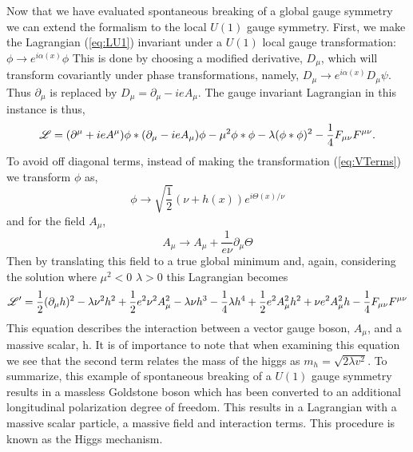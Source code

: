 Now that we have evaluated spontaneous breaking of 
a global gauge symmetry we can extend the formalism to the local $U(1)$ gauge symmetry.
First, we make the Lagrangian (\ref{eq:LU1}) invariant under a $U(1)$ 
local gauge transformation: $\phi\rightarrow e^{i\alpha(x)}\phi$
This is done by choosing a modified derivative, $D_{\mu}$, which will
transform covariantly under phase transformations, namely, 
$D_{\mu}\rightarrow e^{i\alpha(x)}D_{\mu}\psi$. Thus $\partial_{\mu}$
is replaced by $D_{\mu} = \partial_{\mu}-ieA_{\mu}$.
The gauge invariant Lagrangian in this instance is thus,
\begin{equation}
\mathscr{L}=(\partial^{\mu}+ieA^{\mu})\phi*(\partial_{\mu}-ieA_{\mu})\phi - \mu^{2} \phi*\phi - \lambda(\phi*\phi)^{2}-\frac{1}{4}F_{\mu\nu}F^{\mu\nu}.
\end{equation}
To avoid off diagonal terms, instead of making the transformation (\ref{eq:VTerms})
we transform $\phi$ as,
\begin{equation}
\phi\rightarrow\sqrt{\frac{1}{2}}(\nu+h(x))e^{i\Theta(x)/\nu}
\end{equation}
and for the field $A_{\mu}$,
\begin{equation}
A_{\mu}\rightarrow A_{\mu}+\frac{1}{e\nu}\partial_{\mu}\Theta
\end{equation}
Then by translating this field to a true global minimum
and, again, considering the solution where $\mu^{2}<0$ $\lambda>0$ this Lagrangian becomes 
\begin{equation}
\mathscr{L}'=\frac{1}{2}(\partial_{\mu}h)^{2}-\lambda \nu^{2}h^{2}+\frac{1}{2}e^{2}\nu^{2}A_{\mu}^{2}-\lambda\nu h^{3}-
\frac{1}{4}\lambda h^{4} + \frac{1}{2}e^{2}A_{\mu}^{2}h^{2}+\nu e^{2}A_{\mu}^{2}h-\frac{1}{4}F_{\mu\nu}F^{\mu\nu}
\end{equation}
This equation describes the interaction between a vector gauge boson,
$A_{\mu}$, and a massive scalar, h. 
It is of importance to note that when examining this equation 
we see that the second term relates the mass 
of the higgs as $m_{h}=\sqrt{2\lambda v^{2}}$. 
To summarize, this example of spontaneous breaking of a $U(1)$ gauge symmetry
results in a massless Goldstone boson which has been converted to an
additional longitudinal polarization degree of freedom. This results
in a Lagrangian with a massive scalar particle, a massive field and interaction terms.
This procedure is known as the Higgs mechanism. 
%
